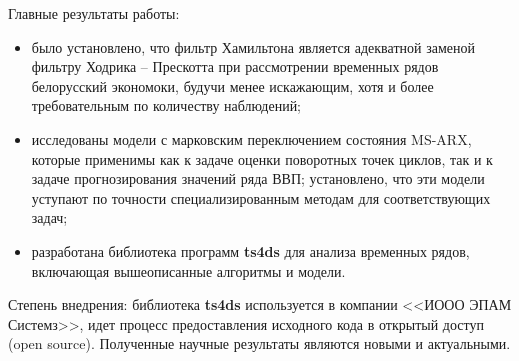 \documentclass[a4paper,14pt]{extreport}
\begin{document}
{		Главные результаты работы: 
		
		\begin{itemize}
			\item было установлено, что фильтр Хамильтона является адекватной заменой фильтру Ходрика -- Прескотта при рассмотрении временных рядов белорусский экономоки, будучи менее искажающим, хотя и более требовательным по количеству наблюдений;
			
			\item исследованы модели с марковским переключением состояния MS-ARX, которые применимы как к задаче оценки поворотных точек циклов, так и к задаче прогнозирования значений ряда ВВП; установлено, что эти модели уступают по точности специализированным методам для соответствующих задач;
			
			\item разработана библиотека программ \textbf{ts4ds} для анализа временных рядов, включающая вышеописанные алгоритмы и модели.
		\end{itemize}
		
		Степень внедрения: библиотека \textbf{ts4ds} используется в компании <<ИООО ЭПАМ Системз>>, идет процесс предоставления исходного кода в открытый доступ (open source).
		Полученные научные результаты являются новыми и актуальными.
		
		\fi
		
	}
	
	\iffalse
	\bsuabstract
	{
		This paper examines methods for extraction of economic cycles, identification of their turning points, and prediction of future values. This paper also compares the results of these methods when used to identify cycles in the GDP of the Republic of Belarus. Methods reviewed: double Hodrick-Prescott filtering, Hamilton's proposed method,  Markov-switching autoregressive models (MS-ARX), and SARIMAX models. The work also includes a short description of the development of a Python-language library for time series analysis and modelling, which includes implementations of the above models.
		
	}{
		В данной работе рассматриваются методы выделения экономических циклов, определения их поворотных точек, и предсказания будущих значений. Также сравниваются результаты применения этих методов при идентификации циклов в ВВП Республики Беларусь. Рассмотренные методы: двойное использование фильтра Ходрика -- Прескотта, метод Хамильтона, авторегрессионные модели с Марковским переключением состояний (MS-ARX), модели SARIMAX. В работе также приводится краткое описание разрабатываемой библиотеки программ на языке Python, предназдаченной для анализа и моделирования временных рядов. Библиотека включает разделы, посвященные вышеописанным моделям.
	}
	\fi
	
\end{document}
